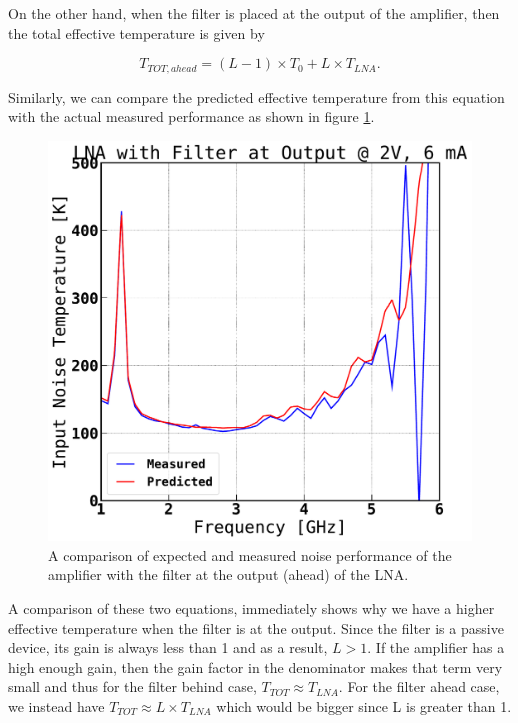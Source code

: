 \documentclass[twocolumn, aps, floatfix]{revtex4-1}
\begin{document}
    On the other hand, when the filter is placed at the output of the amplifier, then the total effective temperature is given by

    \begin{equation}
        T_{TOT, ahead} = \left(L - 1 \right) \times T_0 + L \times T_{LNA}.
    \end{equation}

    Similarly, we can compare the predicted effective temperature from this equation with the actual measured performance as shown in figure \ref{fig:aheadnoisetemp}.
    \begin{figure}[!htbp]
    \centering
    \includegraphics[scale=0.3]{Filter_ahead_noisetemp.pdf}
    \caption{A comparison of expected and measured noise performance of the amplifier with the filter at the output (ahead) of the LNA.}
    \label{fig:aheadnoisetemp}
    \end{figure}

    A comparison of these two equations, immediately shows why we have a higher effective temperature when the filter is at the output. Since the filter is a passive device, its gain is always less than 1 and as a result, $L > 1$. If the amplifier has a high enough gain, then the gain factor in the denominator makes that term very small and thus for the filter behind case, $T_{TOT} \approx T_{LNA}$. For the filter ahead case, we instead have $T_{TOT} \approx L \times T_{LNA}$ which would be bigger since L is greater than 1.
\end{document}
